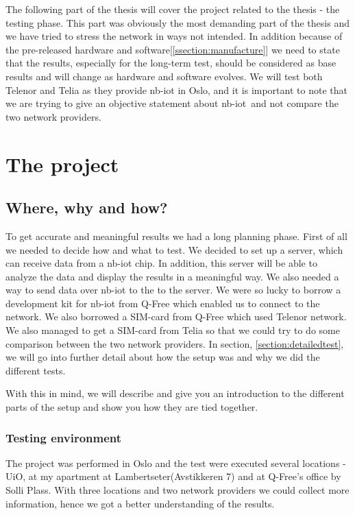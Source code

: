 \documentclass[USenglish]{ifimaster}  %
\begin{document}
The following part of the thesis will cover the project related to the thesis - the testing phase. This part was obviously the most demanding part of the thesis and we have tried to stress the network in ways not intended. In addition because of the pre-released hardware and software[\ref{ssection:manufacture}] we need to state that the results, especially for the long-term test, should be considered as base results and will change as hardware and software evolves. We will test both Telenor and Telia as they provide \acrshort{nb-iot} in Oslo, and it is important to note that we are trying to give an objective statement about \acrshort{nb-iot} and not compare the two network providers.

\part{The project}
\chapter{Where, why and how?} \label{chapter:wherewhynhow}
To get accurate and meaningful results we had a long planning phase. First of all we needed to decide how and what to test. We decided to set up a server, which can receive data from a \acrshort{nb-iot} chip. In addition, this server will be able to analyze the data and display the results in a meaningful way. We also needed a way to send data over \acrshort{nb-iot} to the to the server. We were so lucky to borrow a development kit for \acrshort{nb-iot} from Q-Free which enabled us to connect to the network. We also borrowed a SIM-card from Q-Free which used Telenor network. We also managed to get a SIM-card from Telia so that we could try to do some comparison between the two network providers. In section, \vref{section:detailedtest}, we will go into further detail about how the setup was and why we did the different tests.

With this in mind, we will describe and give you an introduction to the different parts of the setup and show you how they are tied together.

\section{Testing environment}
The project was performed in Oslo and the test were executed several locations - UiO, at my apartment at Lambertseter(Avstikkeren 7) and at Q-Free's office by Solli Plass. With three locations and two network providers we could collect more information, hence we got a better understanding of the results.
\end{document}
